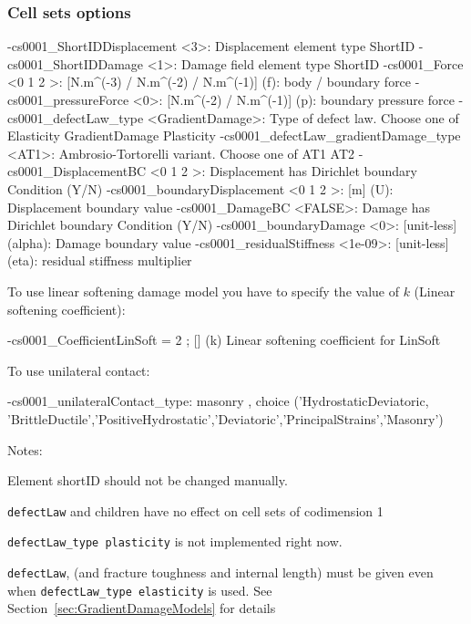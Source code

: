 \documentclass[10pt,oneside]{memoir}
\begin{document}
\subsubsection{Cell sets options}
\small{\begin{boxedverbatim}
-cs0001_ShortIDDisplacement <3>: Displacement element type ShortID 
-cs0001_ShortIDDamage <1>: Damage field element type ShortID 
-cs0001_Force <0 1 2 >: [N.m^(-3) / N.m^(-2) / N.m^(-1)] (f): body / boundary force 
-cs0001_pressureForce <0>: [N.m^(-2) / N.m^(-1)] (p): boundary pressure force 
-cs0001_defectLaw_type <GradientDamage>: Type of defect law. Choose one of 
                                         Elasticity GradientDamage Plasticity
-cs0001_defectLaw_gradientDamage_type <AT1>: Ambrosio-Tortorelli variant. 
                                             Choose one of AT1 AT2
-cs0001_DisplacementBC <0 1 2 >: Displacement has Dirichlet boundary Condition (Y/N) 
-cs0001_boundaryDisplacement <0 1 2 >: [m] (U): Displacement boundary value 
-cs0001_DamageBC <FALSE>: Damage has Dirichlet boundary Condition (Y/N) 
-cs0001_boundaryDamage <0>: [unit-less] (alpha): Damage boundary value 
-cs0001_residualStiffness <1e-09>: [unit-less] (eta): residual stiffness multiplier 
\end{boxedverbatim}}

To use linear softening damage model you have to specify the value of $k$ (Linear softening coefficient):
\begin{boxedverbatim}
-cs0001_CoefficientLinSoft = 2 ; [] (k) Linear softening coefficient for LinSoft
\end{boxedverbatim}


To use unilateral contact:
\begin{boxedverbatim}
-cs0001_unilateralContact_type: masonry , choice ('HydrostaticDeviatoric,
'BrittleDuctile','PositiveHydrostatic','Deviatoric','PrincipalStrains','Masonry')
\end{boxedverbatim}

Notes:
\begin{compactenum}
\item Element shortID should not be changed manually.
\item \verb+defectLaw+ and children have no effect on cell sets of codimension 1
\item \verb+defectLaw_type plasticity+ is not implemented right now.
\item \verb+defectLaw+, (and fracture toughness and internal length) must be given even when \verb+defectLaw_type elasticity+ is used. See Section~\ref{sec:GradientDamageModels} for details
\end{compactenum}
\end{document}
